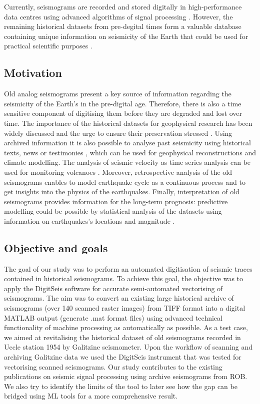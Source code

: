 \documentclass[informatics,article,submit,moreauthors,pdftex]{Definitions/mdpi}
\begin{document}
Currently, seismograms are recorded and stored digitally in high-performance data centres using advanced algorithms of signal processing \cite{Heiner}. However, the remaining historical datasets from pre-degital times form a valuable database containing unique information on seismicity of the Earth that could be used for practical scientific purposes \cite{Kanamorietal2010,Bungum,Kanamorietal2019,lecocq2020linking,Lomnitz2004,Ambraseys1983,lecocq2020social}. 

\subsection{Motivation}
Old analog seismograms present a key source of information regarding the seismicity of the Earth's in the pre-digital age. Therefore, there is also a time sensitive component of digitising them before they are degraded and lost over time. The importance of the historical datasets for geophysical research has been widely discussed \cite{Vogtetal1985, TevesCosta1999,Bono2007,Okal} and the urge to ensure their preservation stressed \cite{Okal}. Using archived information it is also possible to analyse past seismicity using historical texts, news or testimonies \cite{Alexandre1990a,Alexandre1985,Alexandre1990b}, which can be used for geophysical reconstructions and climate modelling. The analysis of seismic velocity as time series analysis can be used for monitoring volcanoes \cite{DePlaen2016,Basowetal,DePlaen2019}. Moreover, retrospective analysis of the old seismograms enables to model earthquake cycle as a continuous process and to get insights into the physics of the earthquakes. Finally, interpretation of old seismograms provides information for the long-term prognosis: predictive modelling could be possible by statistical analysis of the datasets using information on earthquakes's locations and magnitude \cite{Kanamori1988}.

\subsection{Objective and goals}
The goal of our study was to perform an automated digitisation of seismic traces contained in historical seismograms. To achieve this goal, the objective was to apply the DigitSeis software for accurate semi-automated vectorising of seismograms. The aim was to convert an existing large historical archive of seismograms (over 140 scanned raster images) from TIFF format into a digital MATLAB output (generate .mat format files) using advanced technical functionality of machine processing as automatically as possible. As a test case, we aimed at revitalising the historical dataset of old seismograms recorded in Uccle station 1954 by Galitzine seismometer. Upon the workflow of scanning and archiving Galitzine data we used the DigitSeis instrument that was  tested for vectorising scanned seismograms. Our study contributes to the existing publications on seismic signal processing using archive seismograms from \ac{ROB}. We also try to identify the limits of the tool to later see how the gap can be bridged using ML tools for a more comprehensive result.
\end{document}
